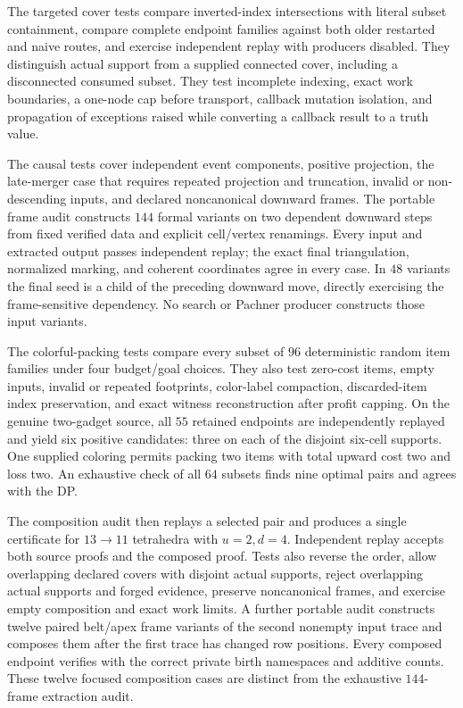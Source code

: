The targeted cover tests compare inverted-index intersections with literal
subset containment, compare complete endpoint families against both older
restarted and naive routes, and exercise independent replay with producers
disabled. They distinguish actual support from a supplied connected cover,
including a disconnected consumed subset. They test incomplete indexing,
exact work boundaries, a one-node cap before transport, callback mutation
isolation, and propagation of exceptions raised while converting a callback
result to a truth value.

The causal tests cover independent event components, positive projection,
the late-merger case that requires repeated projection and truncation,
invalid or non-descending inputs, and declared noncanonical downward
frames. The portable frame audit constructs $144$ formal variants on two
dependent downward steps from fixed verified data and explicit cell/vertex
renamings. Every input and extracted output passes independent replay;
the exact final triangulation, normalized marking, and coherent coordinates
agree in every case. In $48$ variants the final seed is a child of the
preceding downward move, directly exercising the frame-sensitive dependency.
No search or Pachner producer constructs those input variants.

The colorful-packing tests compare every subset of $96$ deterministic
random item families under four budget/goal choices. They also test zero-cost
items, empty inputs, invalid or repeated footprints, color-label compaction,
discarded-item index preservation, and exact witness reconstruction after
profit capping. On the genuine two-gadget source, all $55$ retained endpoints
are independently replayed and yield six positive candidates: three on
each of the disjoint six-cell supports. One supplied coloring permits
packing two items with total upward cost two and loss two. An exhaustive
check of all $64$ subsets finds nine optimal pairs and agrees with the DP.

The composition audit then replays a selected pair and produces a single
certificate for $13\to11$ tetrahedra with $u=2,d=4$. Independent replay
accepts both source proofs and the composed proof. Tests also reverse the
order, allow overlapping declared covers with disjoint actual supports,
reject overlapping actual supports and forged evidence, preserve
noncanonical frames, and exercise empty composition and exact work limits.
A further portable audit constructs twelve paired belt/apex frame variants
of the second nonempty input trace and composes them after the first trace
has changed row positions. Every composed endpoint verifies with the
correct private birth namespaces and additive counts. These twelve focused
composition cases are distinct from the exhaustive $144$-frame extraction
audit.

